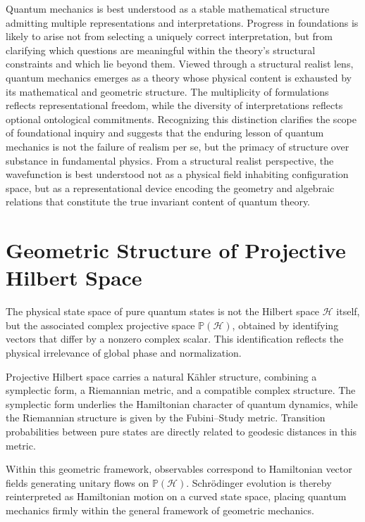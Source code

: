 \documentclass[11pt]{article}
\begin{document}
Quantum mechanics is best understood as a stable mathematical structure admitting multiple representations and interpretations. Progress in foundations is likely to arise not from selecting a uniquely correct interpretation, but from clarifying which questions are meaningful within the theory’s structural constraints and which lie beyond them.
Viewed through a structural realist lens, quantum mechanics emerges as a theory whose physical content is exhausted by its mathematical and geometric structure. The multiplicity of formulations reflects representational freedom, while the diversity of interpretations reflects optional ontological commitments. Recognizing this distinction clarifies the scope of foundational inquiry and suggests that the enduring lesson of quantum mechanics is not the failure of realism per se, but the primacy of structure over substance in fundamental physics.
From a structural realist perspective, the wavefunction is best understood not as a physical field inhabiting configuration space, but as a representational device encoding the geometry and algebraic relations that constitute the true invariant content of quantum theory.

\appendix
\section{Geometric Structure of Projective Hilbert Space}

The physical state space of pure quantum states is not the Hilbert space $\mathcal{H}$ itself, but the associated complex projective space $\mathbb{P}(\mathcal{H})$, obtained by identifying vectors that differ by a nonzero complex scalar. This identification reflects the physical irrelevance of global phase and normalization.

Projective Hilbert space carries a natural Kähler structure, combining a symplectic form, a Riemannian metric, and a compatible complex structure. The symplectic form underlies the Hamiltonian character of quantum dynamics, while the Riemannian structure is given by the Fubini--Study metric. Transition probabilities between pure states are directly related to geodesic distances in this metric.

Within this geometric framework, observables correspond to Hamiltonian vector fields generating unitary flows on $\mathbb{P}(\mathcal{H})$. Schrödinger evolution is thereby reinterpreted as Hamiltonian motion on a curved state space, placing quantum mechanics firmly within the general framework of geometric mechanics.
\end{document}
